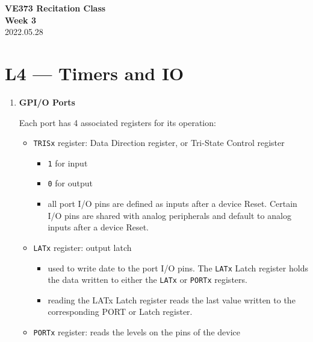 \documentclass[a4paper]{article}
\begin{document}
\renewcommand{\thesection}{\Roman{section}}
\renewcommand{\thesubsection}{\Alph{subsection}}
\renewcommand{\thesubsubsection}{\thesubsection.\arabic{subsubsection}}
\renewcommand{\d}{\: \mathrm{d}}
\newcommand{\e}{\mathrm{e}}

\begin{center}
  \textbf{\Large VE373 Recitation Class}\\[1em]
  \textbf{\large Week 3} \\[1em]
  2022.05.28 \\[1em]
\end{center}

\section*{L4 --- Timers and IO}
  \begin{enumerate}[label = \arabic*.]
    \item \textbf{GPI/O Ports}
      \par Each port has 4 associated registers for its operation:
      \begin{itemize}[leftmargin = 1cm]
        \item \verb|TRISx| register: Data Direction register, or Tri-State Control register
          \begin{itemize}[leftmargin = 1cm]
            \item \verb|1| for input
            \item \verb|0| for output
            \item all port I/O pins are defined as inputs after a device Reset. Certain I/O pins are shared with analog peripherals and default to analog inputs after a device Reset.
          \end{itemize}
        \item \verb|LATx| register: output latch
          \begin{itemize}[leftmargin = 1cm]
            \item used to write date to the port I/O pins. The \verb|LATx| Latch register holds the data written to either
              the \verb|LATx| or \verb|PORTx| registers.
            \item reading the LATx Latch register reads the last value written to the corresponding PORT or Latch register.
          \end{itemize}
        \item \verb|PORTx| register: reads the levels on the pins of the device
          \begin{itemize}[leftmargin = 1cm]

\end{itemize}
\end{itemize}
\end{enumerate}
\end{document}
